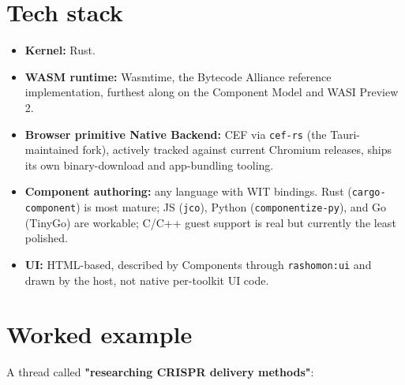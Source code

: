 \documentclass[11pt]{article}
\begin{document}
\section{Tech stack}
\label{sec:org1f1e867}

\begin{itemize}
\item \textbf{Kernel:} Rust.
\item \textbf{WASM runtime:} Wasmtime, the Bytecode Alliance reference implementation, furthest along on the Component Model and WASI Preview 2.
\item \textbf{Browser primitive Native Backend:} CEF via \texttt{cef-rs} (the Tauri-maintained fork), actively tracked against current Chromium releases, ships its own binary-download and app-bundling tooling.
\item \textbf{Component authoring:} any language with WIT bindings. Rust (\texttt{cargo-component}) is most mature; JS (\texttt{jco}), Python (\texttt{componentize-py}), and Go (TinyGo) are workable; C/C++ guest support is real but currently the least polished.
\item \textbf{UI:} HTML-based, described by Components through \texttt{rashomon:ui} and drawn by the host, not native per-toolkit UI code.
\end{itemize}
\section{Worked example}
\label{sec:org3c9eda5}

A thread called \textbf{"researching CRISPR delivery methods"}:
\end{document}
